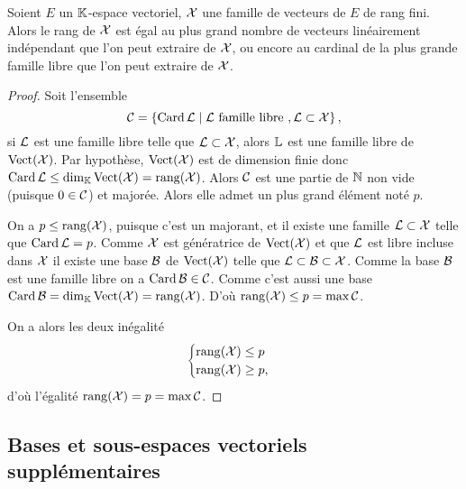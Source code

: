 \begin{theo}
  Soient $E$ un $\mathbb{K}$-espace vectoriel, $\mathcal{X}$ une famille de vecteurs de $E$ de rang fini. Alors le rang de $\mathcal{X}$ est égal au plus grand nombre de vecteurs linéairement indépendant que l'on peut extraire de $\mathcal{X}$, ou encore au cardinal de la plus grande famille libre que l'on peut extraire de $\mathcal{X}$.
\end{theo}
\begin{proof}
  Soit l'ensemble
  \begin{equation}
    \mathcal{C} = \left\{\operatorname{Card} \mathcal{L}\mathrel{}\middle|\mathrel{}\mathcal{L} \text{~famille libre }, \mathcal{L} \subset \mathcal{X}\right\},
  \end{equation}
  si $\mathcal{L}$ est une famille libre telle que $\mathcal{L} \subset \mathcal{X}$, alors $\mathbb{L}$ est une famille libre de $\operatorname{Vect}(\mathcal{X})$. Par hypothèse, $\operatorname{Vect}(\mathcal{X})$ est de dimension finie donc $\operatorname{Card} \mathcal{L} \leq \operatorname{dim}_{\mathbb{K}} \operatorname{Vect}(\mathcal{X})=\operatorname{rang}(\mathcal{X})$. Alors $\mathcal{C}$ est une partie de $\mathbb{N}$ non vide (puisque $0 \in \mathcal{C}$) et majorée. Alors elle admet un plus grand élément noté $p$.

  On a $p \leq \operatorname{rang}(\mathcal{X})$, puisque c'est un majorant, et il existe une famille $\mathcal{L} \subset \mathcal{X}$ telle que $\operatorname{Card} \mathcal{L} =p$. Comme $\mathcal{X}$ est génératrice de $\operatorname{Vect}(\mathcal{X})$ et que $\mathcal{L}$ est libre incluse dans $\mathcal{X}$ il existe une base $\mathcal{B}$ de $\operatorname{Vect}(\mathcal{X})$ telle que $\mathcal{L} \subset \mathcal{B} \subset \mathcal{X}$. Comme la base $\mathcal{B}$ est une famille libre on a $\operatorname{Card} \mathcal{B} \in \mathcal{C}$. Comme c'est aussi une base $\operatorname{Card} \mathcal{B} = \operatorname{dim}_{\mathbb{K}} \operatorname{Vect} (\mathcal{X}) = \operatorname{rang}(\mathcal{X})$. D'où $\operatorname{rang}(\mathcal{X}) \leq p = \max \mathcal{C}$.

On a alors les deux inégalité
\begin{equation}
  \begin{cases}
    \operatorname{rang}(\mathcal{X}) \leq p \\ \operatorname{rang}(\mathcal{X}) \geq p,
  \end{cases}
\end{equation}
d'où l'égalité $\operatorname{rang}(\mathcal{X}) = p= \max \mathcal{C}$.
\end{proof}

\subsection{Bases et sous-espaces vectoriels supplémentaires}

